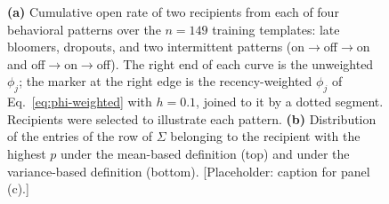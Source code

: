 \begin{figure}[t]
\centering
{}\hfill
{}\hfill
{}
\caption{\textbf{(a)} Cumulative open rate of two recipients from each of four
behavioral patterns over the $n=149$ training templates: late bloomers,
dropouts, and two intermittent patterns (on$\to$off$\to$on and
off$\to$on$\to$off). The right end of each curve is the unweighted $\phi_j$;
the marker at the right edge is the recency-weighted $\phi_j$ of
Eq.~\eqref{eq:phi-weighted} with $h=0.1$, joined to it by a dotted segment.
Recipients were selected to illustrate each pattern.
\textbf{(b)} Distribution of the entries of the row of $\Sigma$ belonging to the
recipient with the highest $p$ under the mean-based definition (top) and under
the variance-based definition (bottom).
[Placeholder: caption for panel (c).]}
\label{fig:phi-p-s}
\end{figure}

